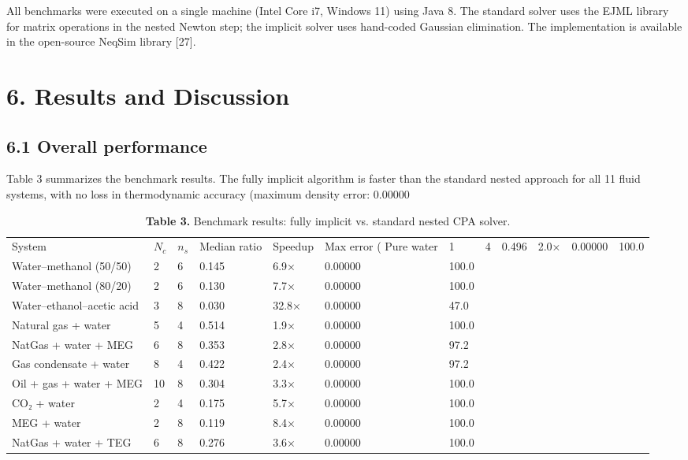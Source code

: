 \documentclass[review,3p]{elsarticle}
\begin{document}
All benchmarks were executed on a single machine (Intel Core i7, Windows 11) using Java 8. The standard solver uses the EJML library for matrix operations in the nested Newton step; the implicit solver uses hand-coded Gaussian elimination. The implementation is available in the open-source NeqSim library [27].


\section{6. Results and Discussion}



\subsection{6.1 Overall performance}

Table 3 summarizes the benchmark results. The fully implicit algorithm is faster than the standard nested approach for all 11 fluid systems, with no loss in thermodynamic accuracy (maximum density error: 0.00000%


\begin{table}[htbp]
\centering
\caption{\textbf{Table 3.} Benchmark results: fully implicit vs. standard nested CPA solver.}
\begin{tabular}{lllllll}
\toprule
System & $N_c$ & $n_s$ & Median ratio & Speedup & Max error (%
\midrule
Pure water & 1 & 4 & 0.496 & 2.0× & 0.00000 & 100.0 \\
Water–methanol (50/50) & 2 & 6 & 0.145 & 6.9× & 0.00000 & 100.0 \\
Water–methanol (80/20) & 2 & 6 & 0.130 & 7.7× & 0.00000 & 100.0 \\
Water–ethanol–acetic acid & 3 & 8 & 0.030 & 32.8× & 0.00000 & 47.0 \\
Natural gas + water & 5 & 4 & 0.514 & 1.9× & 0.00000 & 100.0 \\
NatGas + water + MEG & 6 & 8 & 0.353 & 2.8× & 0.00000 & 97.2 \\
Gas condensate + water & 8 & 4 & 0.422 & 2.4× & 0.00000 & 97.2 \\
Oil + gas + water + MEG & 10 & 8 & 0.304 & 3.3× & 0.00000 & 100.0 \\
CO₂ + water & 2 & 4 & 0.175 & 5.7× & 0.00000 & 100.0 \\
MEG + water & 2 & 8 & 0.119 & 8.4× & 0.00000 & 100.0 \\
NatGas + water + TEG & 6 & 8 & 0.276 & 3.6× & 0.00000 & 100.0 \\
\bottomrule
\end{tabular}
\end{table}
\end{document}
